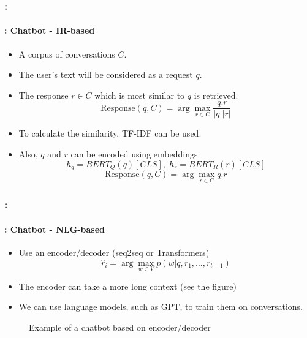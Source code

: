 \documentclass[xcolor=table]{beamer}
\begin{document}
\begin{frame}
	\frametitle{\insertshortsubtitle: \insertsection}
	\framesubtitle{\insertsubsection: Chatbot - IR-based}
	
	\begin{itemize}
		\item A corpus of conversations $C$.
		\item The user's text will be considered as a request $q$.
		\item The response $r \in C$ which is most similar to $q$ is retrieved.
		\[\text{Response}(q, C) = \arg\max_{r \in C} \frac{q . r}{|q| |r|}\]
		\item To calculate the similarity, TF-IDF can be used.
		\item Also, $q$ and $r$ can be encoded using embeddings
		\[h_q = BERT_Q(q)[CLS],\; h_r = BERT_R(r)[CLS]\]
		\[\text{Response}(q, C) = \arg\max_{r \in C} q . r\]
	\end{itemize}
\end{frame}

\begin{frame}
	\frametitle{\insertshortsubtitle: \insertsection}
	\framesubtitle{\insertsubsection: Chatbot - NLG-based}
	
	\begin{itemize}
		\item Use an encoder/decoder (seq2seq or Transformers)
		\[ \hat{r}_i = \arg\max_{w \in V} p(w| q, r_1, \ldots, r_{t-1}) \]
		
		\item The encoder can take a more long context (see the figure)
		
		\item We can use language models, such as GPT, to train them on conversations.
	\end{itemize}
	
	\begin{figure}
		\centering
		\caption{Example of a chatbot based on encoder/decoder \cite{2020-jurafsky-martin}}
	\end{figure}
	
\end{frame}
\end{document}
